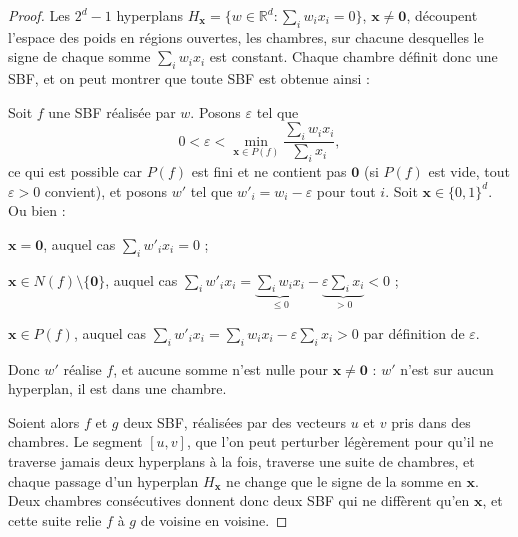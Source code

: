 \documentclass[12pt, a4paper]{article}
\begin{document}
\begin{proof}
Les $2^d - 1$ hyperplans $H_{\mathbf{x}} = \{ w \in \mathbb{R}^d : \sum_i w_i x_i = 0 \}$, $\mathbf{x} \neq \mathbf{0}$, découpent l'espace des poids en régions ouvertes, les chambres, sur chacune desquelles le signe de chaque somme $\sum_i w_i x_i$ est constant.
Chaque chambre définit donc une SBF, et on peut montrer que toute SBF est obtenue ainsi :
\begin{list}{}{\setlength{\leftmargin}{1.5em}\setlength{\topsep}{2pt}\setlength{\labelwidth}{0pt}\setlength{\labelsep}{0pt}\setlength{\itemindent}{0pt}\setlength{\listparindent}{0pt}}
\item[]
  Soit $f$ une SBF réalisée par $w$.
  Posons $\varepsilon$ tel que
  \[
  0 < \varepsilon < \min_{\mathbf{x} \in P(f)} \frac{\sum_i w_i x_i}{\sum_i x_i},
  \]
  ce qui est possible car $P(f)$ est fini et ne contient pas $\mathbf{0}$ (si $P(f)$ est vide, tout $\varepsilon > 0$ convient), et posons $w'$ tel que $w'_i = w_i - \varepsilon$ pour tout $i$.
  Soit $\mathbf{x} \in \{0,1\}^d$. Ou bien :
  \begin{list}{\textbullet}{\setlength{\leftmargin}{1.5em}\setlength{\labelwidth}{1em}\setlength{\labelsep}{0.5em}\setlength{\itemsep}{0pt}\setlength{\topsep}{2pt}}
    \item $\mathbf{x} = \mathbf{0}$, auquel cas $\sum_i w'_i x_i = 0$ ;
    \item $\mathbf{x} \in N(f) \setminus \{\mathbf{0}\}$, auquel cas $\sum_i w'_i x_i = \underbrace{\textstyle\sum_i w_i x_i}_{\le 0} - \underbrace{\textstyle\varepsilon \sum_i x_i}_{> 0} < 0$ ;
    \item $\mathbf{x} \in P(f)$, auquel cas $\sum_i w'_i x_i = \sum_i w_i x_i - \varepsilon \sum_i x_i > 0$ par définition de $\varepsilon$.
  \end{list}
  Donc $w'$ réalise $f$, et aucune somme n'est nulle pour $\mathbf{x} \neq \mathbf{0}$ : $w'$ n'est sur aucun hyperplan, il est dans une chambre.
\end{list}
Soient alors $f$ et $g$ deux SBF, réalisées par des vecteurs $u$ et $v$ pris dans des chambres.
Le segment $[u, v]$, que l'on peut perturber légèrement pour qu'il ne traverse jamais deux hyperplans à la fois, traverse une suite de chambres, et chaque passage d'un hyperplan $H_{\mathbf{x}}$ ne change que le signe de la somme en $\mathbf{x}$.
Deux chambres consécutives donnent donc deux SBF qui ne diffèrent qu'en $\mathbf{x}$, et cette suite relie $f$ à $g$ de voisine en voisine.
\end{proof}
\end{document}
